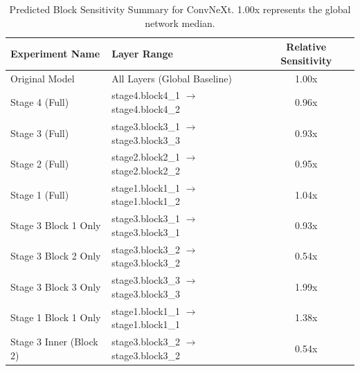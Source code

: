 \begin{table}[h]
\caption{Predicted Block Sensitivity Summary for ConvNeXt. 1.00x represents the global network median.}
\label{tab:rel_sens_summary_convnext}
\begin{tabular}{llc}
\toprule
Experiment Name & Layer Range & Relative Sensitivity \\
\midrule
Original Model & All Layers (Global Baseline) & 1.00x \\
Stage 4 (Full) & stage4.block4\_1 $\to$ stage4.block4\_2 & 0.96x \\
Stage 3 (Full) & stage3.block3\_1 $\to$ stage3.block3\_3 & 0.93x \\
Stage 2 (Full) & stage2.block2\_1 $\to$ stage2.block2\_2 & 0.95x \\
Stage 1 (Full) & stage1.block1\_1 $\to$ stage1.block1\_2 & 1.04x \\
Stage 3 Block 1 Only & stage3.block3\_1 $\to$ stage3.block3\_1 & 0.93x \\
Stage 3 Block 2 Only & stage3.block3\_2 $\to$ stage3.block3\_2 & 0.54x \\
Stage 3 Block 3 Only & stage3.block3\_3 $\to$ stage3.block3\_3 & 1.99x \\
Stage 1 Block 1 Only & stage1.block1\_1 $\to$ stage1.block1\_1 & 1.38x \\
Stage 3 Inner (Block 2) & stage3.block3\_2 $\to$ stage3.block3\_2 & 0.54x \\
\bottomrule
\end{tabular}
\end{table}
